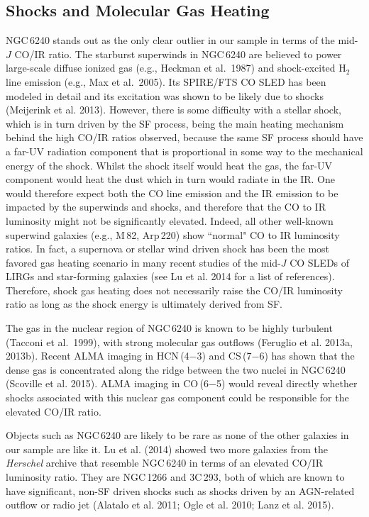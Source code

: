 \documentclass[preprint]{aastex}
\begin{document}
\subsection{Shocks and Molecular Gas Heating} \label{sec5.4}

NGC\,6240 stands out as the only clear outlier in our sample in terms of 
the mid-$J$ CO/IR ratio.   The starburst superwinds in NGC\,6240 are 
believed to power large-scale diffuse ionized gas (e.g., Heckman et al.~1987) 
and shock-excited H$_{2}$ line emission (e.g., Max et al.~2005).   Its 
SPIRE/FTS CO SLED has been modeled in detail and its excitation was shown
to be likely due to shocks (Meijerink et al. 2013).  However,
there is some difficulty with a stellar shock, which is in turn driven 
by the SF process, being the main heating mechanism behind the high 
CO/IR ratios observed, because the same SF process should have a far-UV
radiation component  that is proportional in some way to the mechanical 
energy of the shock. Whilst the shock itself would heat the gas, 
the far-UV component would heat the dust which in turn would radiate 
in the IR. One would therefore expect both the CO line emission and 
the IR emission to be impacted by the superwinds and shocks, and therefore
that the CO to IR luminosity might not be significantly elevated.
Indeed, all other well-known superwind galaxies (e.g., M\,82, Arp\,220) 
show ``normal" CO to IR luminosity ratios.  In fact, a supernova or stellar 
wind driven shock has been the most favored gas heating scenario in many 
recent studies of the mid-$J$ CO SLEDs of LIRGs and star-forming galaxies 
(see Lu et al. 2014 for a list of references).
Therefore, shock gas heating does not necessarily raise the CO/IR luminosity 
ratio as long as the shock energy is ultimately derived from SF.


The gas in the nuclear region of NGC\,6240 is known to be highly turbulent 
(Tacconi et al.~1999), with strong molecular gas outflows (Feruglio et al. 2013a, 
2013b). Recent ALMA imaging in HCN\,(4$-$3) and CS\,(7$-$6) has shown that 
the dense gas is concentrated along the ridge between the two nuclei in NGC\,6240
(Scoville et al. 2015). ALMA imaging in CO\,(6$-$5) would reveal directly 
whether shocks associated with this nuclear gas component could be responsible
for the elevated CO/IR ratio.


Objects such as NGC\,6240 are likely to be rare as none of the other galaxies 
in our sample are like it.  Lu et al. (2014) showed two more galaxies from 
the {\it Herschel} archive that resemble NGC\,6240 in terms of an elevated
CO/IR luminosity ratio.  They are NGC\,1266 and 3C\,293, both of which are 
known to have significant, non-SF driven shocks such as shocks driven by an 
AGN-related outflow or radio jet (Alatalo et al. 2011; Ogle et al. 2010;
Lanz et al. 2015).
\end{document}
